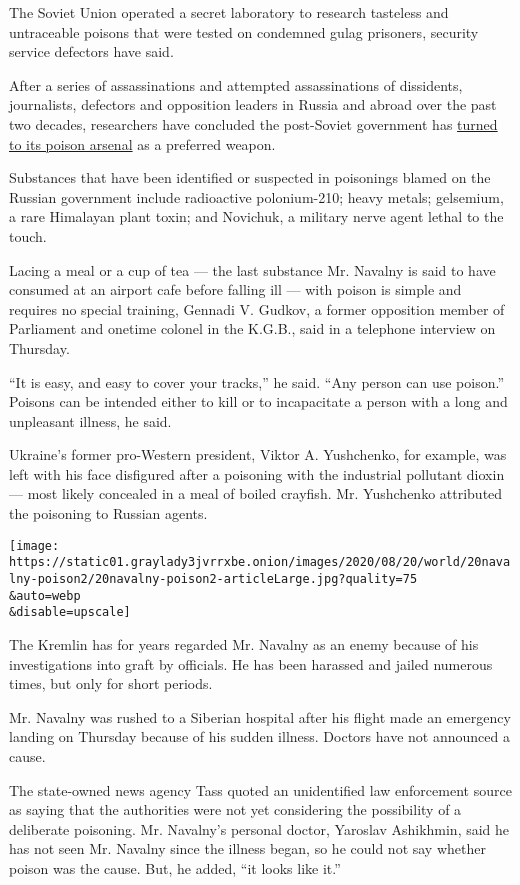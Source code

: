 The Soviet Union operated a secret laboratory to research tasteless and
untraceable poisons that were tested on condemned gulag prisoners,
security service defectors have said.

After a series of assassinations and attempted assassinations of
dissidents, journalists, defectors and opposition leaders in Russia and
abroad over the past two decades, researchers have concluded the
post-Soviet government has
\href{https://www.nytimes3xbfgragh.onion/2016/08/21/world/europe/moscow-kremlin-silence-critics-poison.html}{turned
to its poison arsenal} as a preferred weapon.

Substances that have been identified or suspected in poisonings blamed
on the Russian government include radioactive polonium-210; heavy
metals; gelsemium, a rare Himalayan plant toxin; and Novichuk, a
military nerve agent lethal to the touch.

Lacing a meal or a cup of tea --- the last substance Mr. Navalny is said
to have consumed at an airport cafe before falling ill --- with poison
is simple and requires no special training, Gennadi V. Gudkov, a former
opposition member of Parliament and onetime colonel in the K.G.B., said
in a telephone interview on Thursday.

``It is easy, and easy to cover your tracks,'' he said. ``Any person can
use poison.'' Poisons can be intended either to kill or to incapacitate
a person with a long and unpleasant illness, he said.

Ukraine's former pro-Western president, Viktor A. Yushchenko, for
example, was left with his face disfigured after a poisoning with the
industrial pollutant dioxin --- most likely concealed in a meal of
boiled crayfish. Mr. Yushchenko attributed the poisoning to Russian
agents.

\texttt{[image: https://static01.graylady3jvrrxbe.onion/images/2020/08/20/world/20navalny-poison2/20navalny-poison2-articleLarge.jpg?quality=75\\\&auto=webp\\\&disable=upscale]}

The Kremlin has for years regarded Mr. Navalny as an enemy because of
his investigations into graft by officials. He has been harassed and
jailed numerous times, but only for short periods.

Mr. Navalny was rushed to a Siberian hospital after his flight made an
emergency landing on Thursday because of his sudden illness. Doctors
have not announced a cause.

The state-owned news agency Tass quoted an unidentified law enforcement
source as saying that the authorities were not yet considering the
possibility of a deliberate poisoning. Mr. Navalny's personal doctor,
Yaroslav Ashikhmin, said he has not seen Mr. Navalny since the illness
began, so he could not say whether poison was the cause. But, he added,
``it looks like it.''

